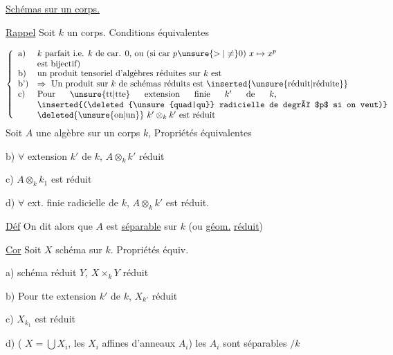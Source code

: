 \uline{Schémas sur un corps.}



\uline{Rappel} Soit $k$ un corps. Conditions équivalentes

\[
\left\{\begin{array}{ll}
\text{a)}&\parbox[t]{.80\linewidth}{$k$ parfait i.e. $k$ de car. $0$, ou (si car $p\unsure{>|\ne}0$) $x\mapsto x^p$ est bijectif)}\\
\text{b)}&\text{un produit tensoriel d'algèbres réduites sur }k\text{ est}\\
\text{b')}&\Rightarrow\ \text{Un produit sur }k\text{ de schémas réduits est \inserted{\unsure{réduit|réduite}}}\\
\text{c)}&\parbox[t]{.80\linewidth}{Pour \unsure{tt|tte} extension finie $k'$ de $k$, \inserted{(\deleted{\unsure{quad|qu}} radicielle de degré $p$ si on veut)} \deleted{\unsure{on|un}} $k' \otimes_k k'$ est réduit}
\end{array}\right.
\]
Soit $A$ une algèbre sur un corps $k$,  Propriétés équivalentes


b) $\forall$ extension $k'$ de $k$, $A\otimes_k k'$ réduit

c) $A\otimes_k k_1$ est réduit

d) $\forall$ ext. finie  radicielle de $k$, $A\otimes_k k'$ est réduit.


\uline{Déf} On dit alors que $A$ est \uline{séparable} sur $k$ (ou \uline{géom.} \uline{réduit})

\uline{Cor} Soit $X$ schéma sur $k$. Propriétés équiv.

a)   schéma réduit $Y$, $X\times_k Y$ réduit

b) Pour tte  extension $k'$ de $k$, $X_{k'}$ réduit

c) $X_{k_1}$ est réduit

 d) ( $X=\bigcup X_i$, les $X_i$ affines  d'anneaux $A_i$) les $A_i$ sont séparables $/k$

